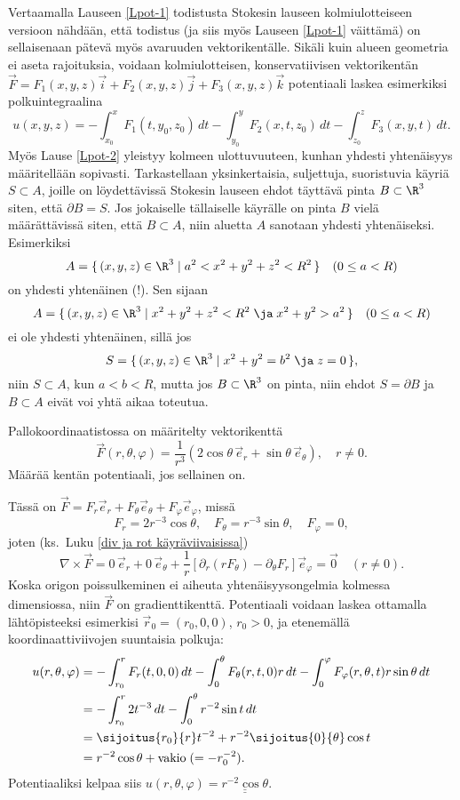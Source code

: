 Vertaamalla Lauseen \ref{Lpot-1} todistusta Stokesin lauseen kolmiulotteiseen versioon 
nähdään, että todistus (ja siis myös Lauseen \ref{Lpot-1} väittämä) on sellaisenaan pätevä
myös avaruuden vektorikentälle. Sikäli kuin alueen geometria ei aseta rajoituksia, voidaan
kolmiulotteisen, konservatiivisen vektorikentän 
$\vec F = F_1(x,y,z)\vec i + F_2(x,y,z)\vec j + F_3(x,y,z)\vec k$ potentiaali laskea esimerkiksi
polkuintegraalina
\[
u(x,y,z) = -\int_{x_0}^x F_1(t,y_0,z_0)\,dt -\int_{y_0}^y F_2(x,t,z_0)\,dt
                                            -\int_{z_0}^z F_3(x,y,t)\,dt.
\]
Myös Lause \ref{Lpot-2} yleistyy kolmeen ulottuvuuteen, kunhan yhdesti yhtenäisyys
määritellään sopivasti. Tarkastellaan yksinkertaisia, suljettuja, suoristuvia käyriä
$S\subset A$, joille on löydettävissä Stokesin lauseen ehdot täyttävä pinta $B\subset\R^3$ 
siten, että $\partial B=S$. Jos jokaiselle tällaiselle käyrälle on pinta $B$ vielä määrättävissä
siten, että $B\subset A$, niin aluetta $A$ sanotaan yhdesti yhtenäiseksi. Esimerkiksi
\[
A=\{\,(x,y,z)\in\R^3 \; | \; a^2<x^2+y^2+z^2<R^2\,\} \quad (0 \le a < R)
\]
on yhdesti yhtenäinen (!). Sen sijaan
\[
A=\{\,(x,y,z)\in\R^3 \; | \; x^2+y^2+z^2<R^2 \; \ja \; x^2+y^2>a^2\,\} \quad (0 \le a < R)
\]
ei ole yhdesti yhtenäinen, sillä jos
\[
S=\{\,(x,y,z)\in\R^3 \; | \; x^2+y^2=b^2 \; \ja \; z=0\,\},
\]
niin $S\subset A$, kun $a<b<R$, mutta jos $B\subset\R^3$ on pinta, niin ehdot $S=\partial B$ ja
$B\subset A$ eivät voi yhtä aikaa toteutua.
\begin{Exa}
Pallokoordinaatistossa on määritelty vektorikenttä
\[
\vec F(r,\theta,\varphi)
            =\frac{1}{r^3}(2\cos\theta\,\vec e_r+\sin\theta\,\vec e_\theta),\quad r\neq 0.
\]
Määrää kentän potentiaali, jos sellainen on.
\end{Exa}
\ratk Tässä on $\vec F=F_r\vec e_r+F_\theta\vec e_\theta+F_\varphi\vec e_\varphi$, missä
\[
F_r=2r^{-3}\cos\theta,\quad F_\theta=r^{-3}\sin\theta,\quad F_\varphi=0,
\]
joten (ks.\ Luku \ref{div ja rot käyräviivaisissa})
\[
\nabla\times\vec F = 0\,\vec e_r + 0\,\vec e_\theta
  + \frac{1}{r}[\partial_r(rF_\theta)-\partial_\theta F_r]\vec e_\varphi = \vec 0\quad (r\neq 0).
\]
Koska origon poissulkeminen ei aiheuta yhtenäisyysongelmia kolmessa dimensiossa, niin $\vec F$
on gradienttikenttä. Potentiaali voidaan laskea ottamalla lähtöpisteeksi esimerkisi
$\vec r_0=(r_0,0,0)$, $r_0>0$, ja etenemällä koordinaattiviivojen suuntaisia polkuja:
\begin{align*}
u(r,\theta,\varphi) &= -\int_{r_0}^r F_r(t,0,0)\,dt-\int_0^\theta F_\theta(r,t,0)r\,dt
                                 -\int_0^\varphi F_\varphi(r,\theta,t)r\sin\theta\,dt \\
                    &= -\int_{r_0}^r 2t^{-3}\,dt-\int_0^\theta r^{-2}\sin t\,dt \\
                    &= \sijoitus{r_0}{r}t^{-2}+r^{-2}\sijoitus{0}{\theta} \cos t \\
                    &= r^{-2}\cos\theta+\text{vakio} \; (=-r_0^{-2}).
\end{align*}
Potentiaaliksi kelpaa siis $u(r,\theta,\varphi)=\underline{\underline{r^{-2}\cos\theta}}$. 
\loppu

